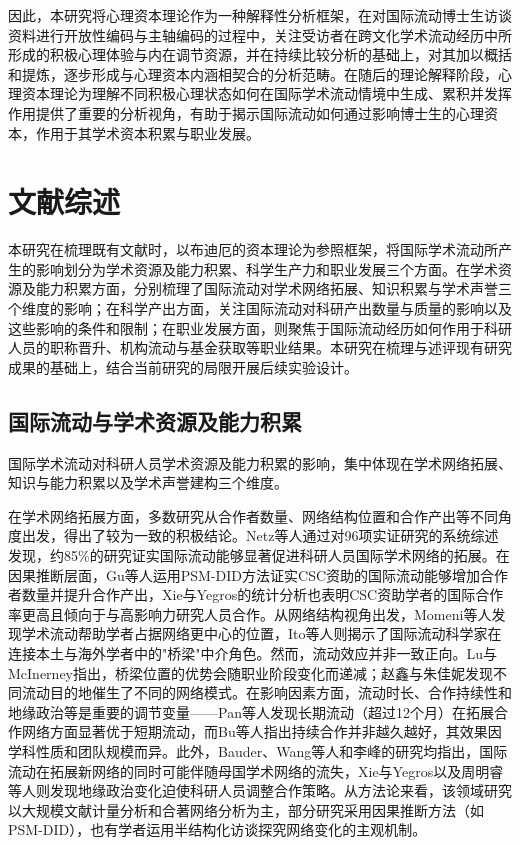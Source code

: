 因此，本研究将心理资本理论作为一种解释性分析框架，在对国际流动博士生访谈资料进行开放性编码与主轴编码的过程中，关注受访者在跨文化学术流动经历中所形成的积极心理体验与内在调节资源，并在持续比较分析的基础上，对其加以概括和提炼，逐步形成与心理资本内涵相契合的分析范畴。在随后的理论解释阶段，心理资本理论为理解不同积极心理状态如何在国际学术流动情境中生成、累积并发挥作用提供了重要的分析视角，有助于揭示国际流动如何通过影响博士生的心理资本，作用于其学术资本积累与职业发展。

\section{文献综述}

本研究在梳理既有文献时，以布迪厄的资本理论为参照框架，将国际学术流动所产生的影响划分为学术资源及能力积累、科学生产力和职业发展三个方面。在学术资源及能力积累方面，分别梳理了国际流动对学术网络拓展、知识积累与学术声誉三个维度的影响；在科学产出方面，关注国际流动对科研产出数量与质量的影响以及这些影响的条件和限制；在职业发展方面，则聚焦于国际流动经历如何作用于科研人员的职称晋升、机构流动与基金获取等职业结果。本研究在梳理与述评现有研究成果的基础上，结合当前研究的局限开展后续实验设计。

\subsection{国际流动与学术资源及能力积累}

国际学术流动对科研人员学术资源及能力积累的影响，集中体现在学术网络拓展、知识与能力积累以及学术声誉建构三个维度。

在学术网络拓展方面，多数研究从合作者数量、网络结构位置和合作产出等不同角度出发，得出了较为一致的积极结论。Netz等人通过对96项实证研究的系统综述发现，约85\%的研究证实国际流动能够显著促进科研人员国际学术网络的拓展\cite{netz2020}。在因果推断层面，Gu等人运用PSM-DID方法证实CSC资助的国际流动能够增加合作者数量并提升合作产出\cite{gu2024}，Xie与Yegros的统计分析也表明CSC资助学者的国际合作率更高且倾向于与高影响力研究人员合作\cite{xie2025}。从网络结构视角出发，Momeni等人发现学术流动帮助学者占据网络更中心的位置\cite{momeni2022}，Ito等人则揭示了国际流动科学家在连接本土与海外学者中的"桥梁"中介角色\cite{ito2025}。然而，流动效应并非一致正向。Lu与McInerney指出，桥梁位置的优势会随职业阶段变化而递减\cite{lu2016}；赵鑫与朱佳妮发现不同流动目的地催生了不同的网络模式\cite{zhaoxin2025}。在影响因素方面，流动时长、合作持续性和地缘政治等是重要的调节变量------Pan等人发现长期流动（超过12个月）在拓展合作网络方面显著优于短期流动\cite{pan2025}，而Bu等人指出持续合作并非越久越好，其效果因学科性质和团队规模而异\cite{bu2018}。此外，Bauder\cite{bauder2020}、Wang等人\cite{wang2019}和李峰\cite{lifeng2018}的研究均指出，国际流动在拓展新网络的同时可能伴随母国学术网络的流失，Xie与Yegros\cite{xie2025}以及周明睿等人则发现地缘政治变化迫使科研人员调整合作策略\cite{zhoumingrui2024}。从方法论来看，该领域研究以大规模文献计量分析和合著网络分析为主，部分研究采用因果推断方法（如PSM-DID），也有学者运用半结构化访谈探究网络变化的主观机制。

